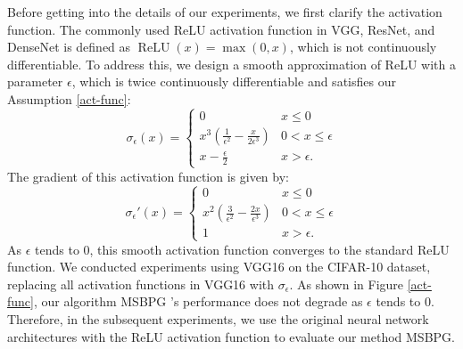 \documentclass[twoside,11pt]{article}
\begin{document}
Before getting into the details of our experiments, we first clarify the activation function. The commonly used ReLU activation function in VGG, ResNet, and DenseNet is defined as $\operatorname{ReLU}(x) = \max(0, x)$, which is not continuously differentiable. To address this, we design a smooth approximation of ReLU with a parameter $\epsilon$, which is twice continuously differentiable and satisfies our Assumption \ref{act-func}:
\[
\sigma_\epsilon(x) = \left\{
\begin{array}{cc}
     0 & x \le 0 \\
     x^3\left(\frac{1}{\epsilon^2}-\frac{x}{2\epsilon^3}\right) & 0 < x \le \epsilon \\
     x - \frac{\epsilon}{2} & x > \epsilon.
\end{array}\right.
\]
The gradient of this activation function is given by:
\[
\sigma_\epsilon'(x) = \left\{
\begin{array}{cc}
     0 & x \le 0 \\
     x^2(\frac{3}{\epsilon^2}-\frac{2x}{\epsilon^3}) & 0 < x \le \epsilon \\
     1 & x > \epsilon.
\end{array}\right.
\]
As $\epsilon$ tends to 0, this smooth activation function converges to the standard ReLU function. We conducted experiments using VGG16 on the CIFAR-10 dataset, replacing all activation functions in VGG16 with $\sigma_\epsilon$. As shown in Figure \ref{act-func}, our algorithm MSBPG 's performance does not degrade as $\epsilon$ tends to 0. Therefore, in the subsequent experiments, we use the original neural network architectures with the ReLU activation function to evaluate our method MSBPG.
\end{document}
